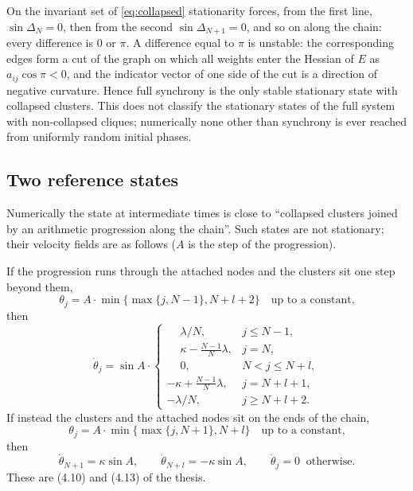 \documentclass[a4paper,11pt]{article}
\theoremstyle{remark}
\begin{document}
On the invariant set of \eqref{eq:collapsed} stationarity forces, from the
first line, $\sin\Delta_N=0$, then from the second $\sin\Delta_{N+1}=0$, and so
on along the chain: every difference is $0$ or $\pi$. A difference equal to
$\pi$ is unstable: the corresponding edges form a cut of the graph on which
all weights enter the Hessian of $E$ as $a_{ij}\cos\pi<0$, and the indicator
vector of one side of the cut is a direction of negative curvature. Hence full
synchrony is the only stable stationary state with collapsed clusters. This
does not classify the stationary states of the full system with non-collapsed
cliques; numerically none other than synchrony is ever reached from uniformly
random initial phases.

\subsection{Two reference states}

Numerically the state at intermediate times is close to ``collapsed clusters
joined by an arithmetic progression along the chain''. Such states are not
stationary; their velocity fields are as follows ($A$ is the step of the
progression).

If the progression runs through the attached nodes and the clusters sit one
step beyond them,
\[
\theta_j=A\cdot\min\{\max\{j,N-1\},N+l+2\}\quad\text{up to a constant,}
\]
then
\begin{equation}\label{eq:state-one}
\dot\theta_j=\sin A\cdot
\begin{cases}
\phantom{-}\lambda/N, & j\le N-1,\\
\phantom{-}\kappa-\frac{N-1}{N}\lambda, & j=N,\\
\phantom{-}0, & N<j\le N+l,\\
-\kappa+\frac{N-1}{N}\lambda, & j=N+l+1,\\
-\lambda/N, & j\ge N+l+2 .
\end{cases}
\end{equation}
If instead the clusters and the attached nodes sit on the ends of the chain,
\[
\theta_j=A\cdot\min\{\max\{j,N+1\},N+l\}\quad\text{up to a constant,}
\]
then
\begin{equation}\label{eq:state-two}
\dot\theta_{N+1}=\kappa\sin A,\qquad \dot\theta_{N+l}=-\kappa\sin A,\qquad
\dot\theta_j=0\ \text{ otherwise.}
\end{equation}
These are (4.10) and (4.13) of the thesis.

\end{document}
